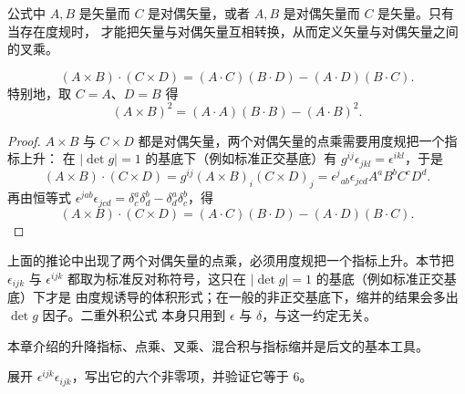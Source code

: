 \begin{remark}
公式中 $A,B$ 是矢量而 $C$ 是对偶矢量，或者 $A,B$ 是对偶矢量而 $C$ 是矢量。只有当存在度规时，
才能把矢量与对偶矢量互相转换，从而定义矢量与对偶矢量之间的叉乘。
\end{remark}

\begin{corollary}
\[
(A\times B)\cdot(C\times D)=(A\cdot C)(B\cdot D)-(A\cdot D)(B\cdot C).
\]
特别地，取 $C=A$、$D=B$ 得
\[
(A\times B)^2=(A\cdot A)(B\cdot B)-(A\cdot B)^2 .
\]
\end{corollary}

\begin{proof}
$A\times B$ 与 $C\times D$ 都是对偶矢量，两个对偶矢量的点乘需要用度规把一个指标上升：
在 $|\det g|=1$ 的基底下（例如标准正交基底）有 $g^{ij}\epsilon_{jkl}=\epsilon^{ikl}$，于是
\[
(A\times B)\cdot(C\times D)=g^{ij}(A\times B)_i(C\times D)_j
=\epsilon^{j}{}_{ab}\epsilon_{jcd}A^aB^bC^cD^d .
\]
再由恒等式 $\epsilon^{jab}\epsilon_{jcd}=\delta^a_c\delta^b_d-\delta^a_d\delta^b_c$，得
\[
(A\times B)\cdot(C\times D)=(A\cdot C)(B\cdot D)-(A\cdot D)(B\cdot C).
\]
\end{proof}

\begin{remark}
上面的推论中出现了两个对偶矢量的点乘，必须用度规把一个指标上升。本节把 $\epsilon_{ijk}$ 与
$\epsilon^{ijk}$ 都取为标准反对称符号，这只在 $|\det g|=1$ 的基底（例如标准正交基底）下才是
由度规诱导的体积形式；在一般的非正交基底下，缩并的结果会多出 $\det g$ 因子。二重外积公式
本身只用到 $\epsilon$ 与 $\delta$，与这一约定无关。
\end{remark}

本章介绍的升降指标、点乘、叉乘、混合积与指标缩并是后文的基本工具。

\begin{exercise}
展开 $\epsilon^{ijk}\epsilon_{ijk}$，写出它的六个非零项，并验证它等于 $6$。
\end{exercise}
